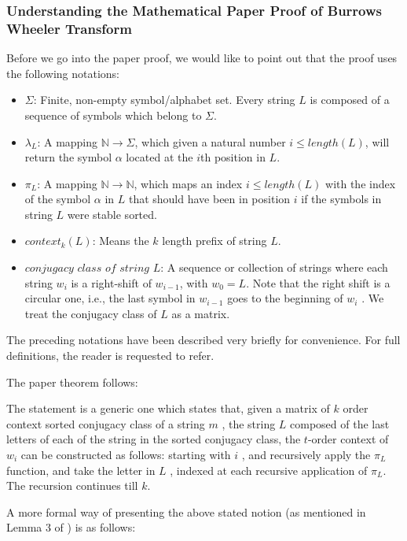 \documentclass[11pt,letterpaper,]{article}
\begin{document}
\subsubsection{Understanding the Mathematical Paper Proof of Burrows Wheeler
Transform}

Before we go into the paper proof, we would like to point out that the proof
uses the following notations:

\begin{itemize}
    \item $\Sigma$: Finite, non-empty symbol/alphabet set. Every string $L$ is
        composed of a sequence of symbols which belong to $\Sigma$.
    \item $\lambda_L$: A mapping $\mathbb{N}\rightarrow\Sigma$, which given a
        natural number $i \leq length(L)$, will return the symbol $\alpha$
        located at the $i$th position in $L$.
    \item $\pi_L$: A mapping $\mathbb{N}\rightarrow\mathbb{N}$, which maps an
        index $i \leq length(L)$ with the index of the symbol $\alpha$ in $L$
        that should have been in position $i$ if the symbols in string $L$ were
        stable sorted.
    \item $context_k(L)$: Means the $k$ length prefix of string $L$.
    \item $\textit{conjugacy class of string }L$: A sequence or collection of
        strings where each string $w_i$ is a right-shift of $w_{i-1}$, with
        $w_0 = L$. Note that the right shift is a circular one, i.e., the last
        symbol in $w_{i-1}$ goes to the beginning of $w_i$ . We treat the
        conjugacy class of $L$ as a matrix.
\end{itemize}

The preceding notations have been described very briefly for convenience. For
full definitions, the reader is requested to refer\cite{kufleitner2009on}.

The paper theorem follows:

The statement is a generic one which states that, given a matrix of $k$ order
context sorted conjugacy class of a string $m$ , the string $L$ composed of the
last letters of each of the string in the sorted conjugacy class, the $t$-order
context of $w_i$ can be constructed as follows: starting with $i$ , and
recursively apply the $\pi_L$ function, and take the letter in $L$ , indexed at
each recursive application of $\pi_L$. The recursion continues till $k$.

A more formal way of presenting the above stated notion (as mentioned in Lemma
3 of \cite{kufleitner2009on}) is as follows:
\end{document}
